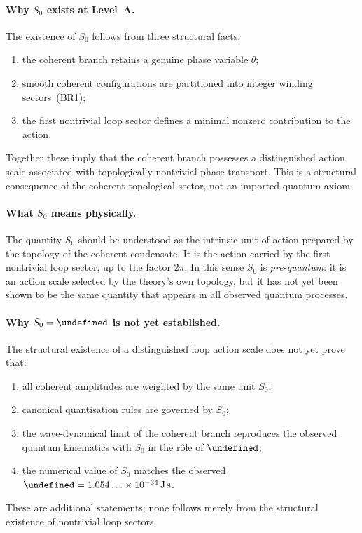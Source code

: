 \documentclass[11pt,a4paper]{article}
\let\hbar\undefined
\numberwithin{equation}{section}
\begin{document}
\paragraph{Why $S_0$ exists at Level~A.}
The existence of $S_0$ follows from three structural facts:
\begin{enumerate}[label=(\roman*)]
  \item the coherent branch retains a genuine phase variable $\theta$;
  \item smooth coherent configurations are partitioned into integer
    winding sectors~(BR1);
  \item the first nontrivial loop sector defines a minimal nonzero
    contribution to the action.
\end{enumerate}
Together these imply that the coherent branch possesses a distinguished
action scale associated with topologically nontrivial phase transport.
This is a structural consequence of the coherent-topological sector,
not an imported quantum axiom.

\paragraph{What $S_0$ means physically.}
The quantity $S_0$ should be understood as the intrinsic unit of action
prepared by the topology of the coherent condensate.
It is the action carried by the first nontrivial loop sector, up to the
factor $2\pi$.
In this sense $S_0$ is \emph{pre-quantum}: it is an action scale
selected by the theory's own topology, but it has not yet been shown to
be the same quantity that appears in all observed quantum processes.

\paragraph{Why $S_0=\hbar$ is not yet established.}
The structural existence of a distinguished loop action scale does not
yet prove that:
\begin{enumerate}[label=(\roman*)]
  \item all coherent amplitudes are weighted by the same unit $S_0$;
  \item canonical quantisation rules are governed by $S_0$;
  \item the wave-dynamical limit of the coherent branch reproduces the
    observed quantum kinematics with $S_0$ in the r\^ole of $\hbar$;
  \item the numerical value of $S_0$ matches the observed
    $\hbar=1.054\ldots\times10^{-34}\,\mathrm{J\,s}$.
\end{enumerate}
These are additional statements; none follows merely from
the structural existence of nontrivial loop sectors.
\end{document}
